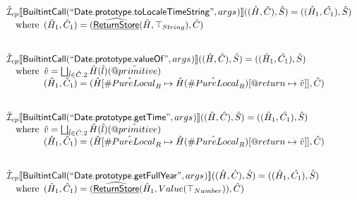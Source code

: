 \documentclass{article}
\makeatletter
\newcommand{\SF}[1]{\mbox{\textsf{#1}}}
\newcommand{\wherec}[1]{{\rm where}\begin{array}[t]{l}#1\end{array}}
\newcommand{\aI}{\hat{\mathcal{I}}}
\newcommand{\lbr}{\llbracket}
\newcommand{\rbr}{\rrbracket}
\newcommand{\ahf}[1]{\widehat{\underline{\sf #1}}}
\newcommand{\varprop}[1]{@#1}
\newcommand{\avarloc}[1]{\hat{\##1}}
\newcommand{\avarprop}[1]{\hat{@#1}}
\makeatother
\begin{document}
\[\begin{array}{l}
\aI _{cp}\lbr \SF{BuiltintCall}(``\SF{Date.prototype.toLocaleTimeString}",args_{})\rbr((\hat{H},\hat{C}), \hat{S})
  = ((\hat{H}_1, \hat{C_1}), \hat{S})\\
\quad\wherec{
  (\hat{H}_1, \hat{C}_1) = (\ahf{ReturnStore}(\hat{H},\top_{String}), \hat{C})\\
  }\\
\\\\

\aI _{cp}\lbr \SF{BuiltintCall}(``\SF{Date.prototype.valueOf}",args_{})\rbr((\hat{H},\hat{C}), \hat{S})
  = ((\hat{H}_1, \hat{C_1}), \hat{S})\\
\quad\wherec{
  \hat{v} = \bigsqcup_{\hat{l} \in \hat{C}.2} \hat{H}(\hat{l})(\avarprop{primitive})\\
  (\hat{H}_1, \hat{C}_1) = 
    (\hat{H}[\avarloc{PureLocal}_R \mapsto \hat{H}(\avarloc{PureLocal}_R)
      [\varprop{return} \mapsto \hat{v}]], \hat{C})\\
  }\\
\\\\

\aI _{cp}\lbr \SF{BuiltintCall}(``\SF{Date.prototype.getTime}",args_{})\rbr((\hat{H},\hat{C}), \hat{S})
  = ((\hat{H}_1, \hat{C_1}), \hat{S})\\
\quad\wherec{
  \hat{v} = \bigsqcup_{\hat{l} \in \hat{C}.2} \hat{H}(\hat{l})(\avarprop{primitive})\\
  (\hat{H}_1, \hat{C}_1) = 
    (\hat{H}[\avarloc{PureLocal}_R \mapsto \hat{H}(\avarloc{PureLocal}_R)
      [\varprop{return} \mapsto \hat{v}]], \hat{C})\\
  }\\
\\\\


\aI _{cp}\lbr \SF{BuiltintCall}(``\SF{Date.prototype.getFullYear}",args_{})\rbr((\hat{H},\hat{C}), \hat{S})
  = ((\hat{H}_1, \hat{C_1}), \hat{S})\\
\quad\wherec{ 
  (\hat{H}_1, \hat{C}_1) = (\ahf{ReturnStore}(\hat{H}_1, Value(\top_{Number})), \hat{C})
  }\\
\\\\



\end{array}\]
\end{document}
